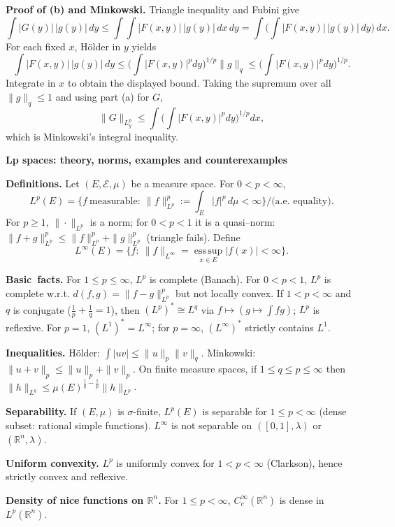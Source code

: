 \begin{problem}[CP-III-0010]
	\medskip

	\textbf{Proof of (b) and Minkowski.}
	Triangle inequality and Fubini give
	\[
	\int |G(y)|\,|g(y)|\,dy
	\le \int \!\!\int |F(x,y)|\,|g(y)|\,dx\,dy
	= \int \Big(\int |F(x,y)|\,|g(y)|\,dy\Big)\,dx.
	\]
	For each fixed $x$, Hölder in $y$ yields
	\[
	\int |F(x,y)|\,|g(y)|\,dy \le
	\Big(\int |F(x,y)|^{p}dy\Big)^{1/p}\|g\|_{q}\le
	\Big(\int |F(x,y)|^{p}dy\Big)^{1/p}.
	\]
	Integrate in $x$ to obtain the displayed bound. Taking the supremum over all $\|g\|_{q}\le1$ and using part (a) for $G$,
	\[
	\|G\|_{L^{p}_y}
	\le \int \Big(\int |F(x,y)|^{p}dy\Big)^{1/p} dx,
	\]
	which is Minkowski’s integral inequality.


\par\medskip\noindent\textbf{Lp spaces: theory, norms, examples and counterexamples}\quad


	\textbf{Definitions.}
	Let $(E,\mathcal E,\mu)$ be a measure space. For $0<p<\infty$,
	\[
	L^p(E)=\{ f\ \text{measurable}:\ \|f\|_{L^p}^p:=\int_E |f|^p\,d\mu<\infty\}
	\big/ \text{(a.e.\ equality)}.
	\]
	For $p\ge 1$, $\|\cdot\|_{L^p}$ is a norm; for $0<p<1$ it is a quasi–norm:
	$\|f+g\|_{L^p}^p\le \|f\|_{L^p}^p+\|g\|_{L^p}^p$ (triangle fails).
	Define
	\[
	L^\infty(E)=\{ f:\ \|f\|_{L^\infty}=\operatorname*{ess\,sup}_{x\in E}|f(x)|<\infty\}.
	\]

	\mbox{\textbf{Basic facts.}}
	For $1\le p\le\infty$, $L^p$ is complete (Banach). For $0<p<1$, $L^p$ is complete w.r.t.
	$d(f,g)=\|f-g\|_{L^p}^p$ but not locally convex.
	If $1<p<\infty$ and $q$ is conjugate ($\tfrac1p+\tfrac1q=1$), then $(L^p)^*\cong L^q$ via
	$f\mapsto (g\mapsto \int fg)$; $L^p$ is reflexive. For $p=1$, $(L^1)^*=L^\infty$; for $p=\infty$,
	$(L^\infty)^*$ strictly contains $L^1$.

	\textbf{Inequalities.}
	Hölder: $\int |uv|\le \|u\|_p\|v\|_q$.
	Minkowski: $\|u+v\|_p\le \|u\|_p+\|v\|_p$.
	On finite measure spaces, if $1\le q\le p\le\infty$ then
	$\|h\|_{L^q}\le \mu(E)^{\frac1q-\frac1p}\|h\|_{L^p}$.

	\textbf{Separability.}
	If $(E,\mu)$ is $\sigma$-finite, $L^p(E)$ is separable for $1\le p<\infty$
	(dense subset: rational simple functions). $L^\infty$ is not separable on
	$([0,1],\lambda)$ or $(\mathbb R^n,\lambda)$.

	\textbf{Uniform convexity.}
	$L^p$ is uniformly convex for $1<p<\infty$ (Clarkson), hence strictly convex and reflexive.

	\textbf{Density of nice functions on $\mathbb R^n$.}
	For $1\le p<\infty$, $C_c^\infty(\mathbb R^n)$ is dense in $L^p(\mathbb R^n)$.


\end{problem}

